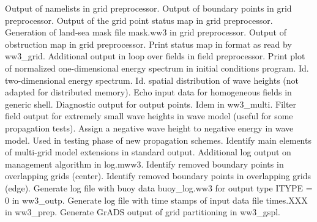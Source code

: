 \begin{slist}
  {Output of namelists in grid preprocessor.}
  {Output of boundary points in grid preprocessor.}
  {Output of the grid point status map in grid preprocessor.} 
 {Generation of land-sea mask file {\file mask.ww3} in grid
           preprocessor.}
 {Output of obstruction map in grid preprocessor.}
 {Print status map in format as read by {\file ww3\_grid}.}
  {Additional output in loop over fields in field preprocessor.}
  {Print plot of normalized one-dimensional energy
           spectrum in initial conditions program.}
  {Id. two-dimensional energy spectrum.}
  {Id. spatial distribution of wave heights (not adapted for 
           distributed memory).}
  {Echo input data for homogeneous fields in generic shell.}
 {Diagnostic output for output points.}
 {Idem in {\file ww3\_multi}.}
  {Filter field output for extremely small wave heights
           in wave model (useful for some propagation tests).}
  {Assign a negative wave height to negative energy in wave model.
           Used in testing phase of new propagation schemes.}
 {Identify main elements of multi-grid model extensions in
           standard output.}
 {Additional log output on management algorithm in {\file log.mww3}.}
 {Identify removed boundary points in overlapping grids (center).}
 {Identify removed boundary points in overlapping grids (edge).}
 {Generate log file with buoy data {\file buoy\_log.ww3} for output
           type {\code ITYPE = 0} in {\file ww3\_outp}.}
 {Generate log file with time stamps of input data file {\file
           times.XXX} in {\file ww3\_prep}.}
 {Generate GrADS output of grid partitioning in {\file ww3\_gspl}.}
\end{slist}

